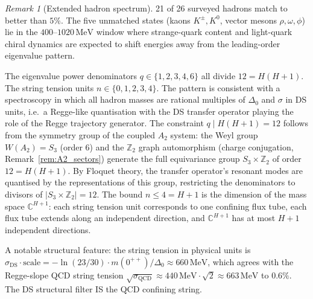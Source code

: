 \documentclass[11pt,a4paper]{article}
\theoremstyle{definition}
\theoremstyle{remark}
\newtheorem{remark}[theorem]{Remark}
\newcommand{\C}{\mathbb{C}}
\newcommand{\Z}{\mathbb{Z}}
\begin{document}
\begin{remark}[Extended hadron spectrum]
21 of 26 surveyed hadrons match to better than $5\%$. The five unmatched states (kaons $K^\pm,K^0$, vector mesons $\rho,\omega,\phi$) lie in the $400$--$1020\,\mathrm{MeV}$ window where strange-quark content and light-quark chiral dynamics are expected to shift energies away from the leading-order eigenvalue pattern.

The eigenvalue power denominators $q\in\{1,2,3,4,6\}$ all divide $12=H(H+1)$. The string tension units $n\in\{0,1,2,3,4\}$. The pattern is consistent with a spectroscopy in which all hadron masses are rational multiples of $\Delta_0$ and $\sigma$ in DS units, i.e.\ a Regge-like quantisation with the DS transfer operator playing the role of the Regge trajectory generator. The constraint $q\mid H(H+1)=12$ follows from the symmetry group of the coupled $A_2$ system: the Weyl group $W(A_2)=S_3$ (order $6$) and the $\Z_2$ graph automorphism (charge conjugation, Remark~\ref{rem:A2_sectors}) generate the full equivariance group $S_3\times\Z_2$ of order $12=H(H+1)$. By Floquet theory, the transfer operator's resonant modes are quantised by the representations of this group, restricting the denominators to divisors of $|S_3\times\Z_2|=12$. The bound $n\leq 4=H+1$ is the dimension of the mass space $\C^{H+1}$: each string tension unit corresponds to one confining flux tube, each flux tube extends along an independent direction, and $\C^{H+1}$ has at most $H+1$ independent directions.

A notable structural feature: the string tension in physical units is $\sigma_{\mathrm{DS}}\cdot\mathrm{scale}=-\ln(23/30)\cdot m(0^{++})/\Delta_0\approx 660\,\mathrm{MeV}$, which agrees with the Regge-slope QCD string tension $\sqrt{\sigma_{\mathrm{QCD}}}\approx 440\,\mathrm{MeV}\cdot\sqrt{2}\approx 663\,\mathrm{MeV}$ to $0.6\%$. The DS structural filter IS the QCD confining string.
\end{remark}
\end{document}
